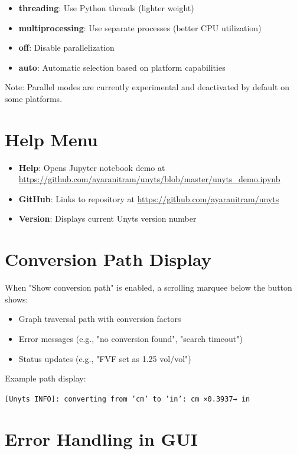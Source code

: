 \documentclass[11pt,a4paper]{report}
\begin{document}
\begin{itemize}
\item \textbf{threading}: Use Python threads (lighter weight)
\item \textbf{multiprocessing}: Use separate processes (better CPU utilization)
\item \textbf{off}: Disable parallelization
\item \textbf{auto}: Automatic selection based on platform capabilities
\end{itemize}

Note: Parallel modes are currently experimental and deactivated by default on some platforms.

\section{Help Menu}

\begin{itemize}
\item \textbf{Help}: Opens Jupyter notebook demo at \url{https://github.com/ayaranitram/unyts/blob/master/unyts_demo.ipynb}
\item \textbf{GitHub}: Links to repository at \url{https://github.com/ayaranitram/unyts}
\item \textbf{Version}: Displays current Unyts version number
\end{itemize}

\section{Conversion Path Display}

When "Show conversion path" is enabled, a scrolling marquee below the button shows:

\begin{itemize}
\item Graph traversal path with conversion factors
\item Error messages (e.g., "no conversion found", "search timeout")
\item Status updates (e.g., "FVF set as 1.25 vol/vol")
\end{itemize}

Example path display:
\begin{center}
\texttt{[Unyts INFO]: converting from 'cm' to 'in': cm ×0.3937→ in}
\end{center}

\section{Error Handling in GUI}
\end{document}
